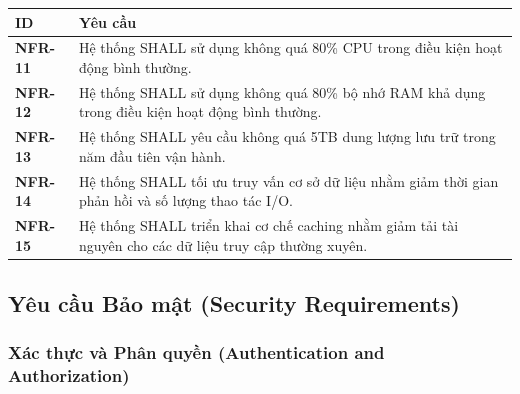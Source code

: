 \documentclass[12pt, a4paper]{article}
\begin{document}
\begin{table}[H]
    \centering
    \renewcommand{\arraystretch}{1.3}

    \begin{tabularx}{\textwidth}{|l|X|}
        \hline
        \rowcolor{gray!10}
        \textbf{ID}     & \textbf{Yêu cầu}                                                                                         \\
        \hline
        \textbf{NFR-11} & Hệ thống SHALL sử dụng không quá 80\% CPU trong điều kiện hoạt động bình thường.                         \\
        \hline
        \textbf{NFR-12} & Hệ thống SHALL sử dụng không quá 80\% bộ nhớ RAM khả dụng trong điều kiện hoạt động bình thường.         \\
        \hline
        \textbf{NFR-13} & Hệ thống SHALL yêu cầu không quá 5TB dung lượng lưu trữ trong năm đầu tiên vận hành.                     \\
        \hline
        \textbf{NFR-14} & Hệ thống SHALL tối ưu truy vấn cơ sở dữ liệu nhằm giảm thời gian phản hồi và số lượng thao tác I/O.      \\
        \hline
        \textbf{NFR-15} & Hệ thống SHALL triển khai cơ chế caching nhằm giảm tải tài nguyên cho các dữ liệu truy cập thường xuyên. \\
        \hline
    \end{tabularx}

\end{table}

\subsection{Yêu cầu Bảo mật (Security Requirements)}

\subsubsection{Xác thực và Phân quyền (Authentication and Authorization)}
\end{document}
